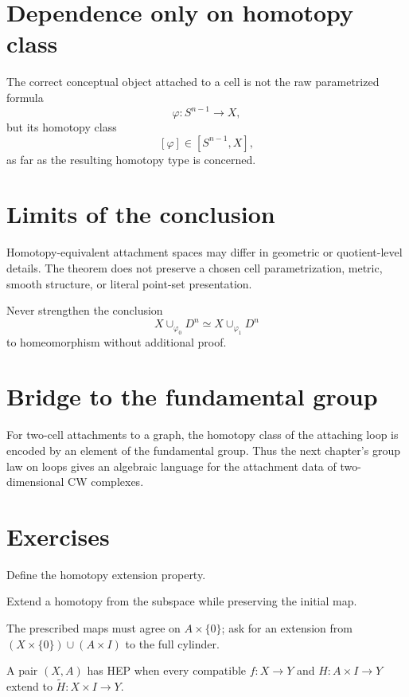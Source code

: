 \section{Dependence only on homotopy class}

The correct conceptual object attached to a cell is not the raw parametrized
formula
\[
\varphi:S^{n-1}\to X,
\]
but its homotopy class
\[
[\varphi]\in[S^{n-1},X],
\]
as far as the resulting homotopy type is concerned.

\section{Limits of the conclusion}

Homotopy-equivalent attachment spaces may differ in geometric or quotient-level
details.  The theorem does not preserve a chosen cell parametrization, metric,
smooth structure, or literal point-set presentation.

\begin{warning}
\label{warn:viii08-homeomorphism}
Never strengthen the conclusion
\[
X\cup_{\varphi_0}D^n\simeq X\cup_{\varphi_1}D^n
\]
to homeomorphism without additional proof.
\end{warning}

\section{Bridge to the fundamental group}

For two-cell attachments to a graph, the homotopy class of the attaching loop
is encoded by an element of the fundamental group.  Thus the next chapter's
group law on loops gives an algebraic language for the attachment data of
two-dimensional CW complexes.


\section{Exercises}

\begin{exercise}\label{exr:viii08-01}
Define the homotopy extension property.
\end{exercise}
\begin{hint}
Extend a homotopy from the subspace while preserving the initial map.

The prescribed maps must agree on \(A\times\{0\}\); ask for an extension from \((X\times\{0\})\cup(A\times I)\) to the full cylinder.
\end{hint}
\begin{solution}
A pair \((X,A)\) has HEP when every compatible \(f:X\to Y\) and \(H:A\times I\to Y\) extend to \(\widetilde H:X\times I\to Y\).
\end{solution}

